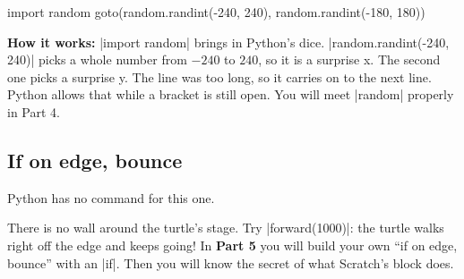 \begin{tcbraster}[raster columns=5, raster equal height=rows, raster column skip=12pt, raster valign=center]
\begin{tcolorbox}[raster multicolumn=2, colback=white, colframe=white, boxrule=0pt, valign=center]
\begin{scratch}
\end{scratch}
\end{tcolorbox}
\begin{tcolorbox}[raster multicolumn=3, blank]
\begin{code}
import random
goto(random.randint(-240, 240),
     random.randint(-180, 180))
\end{code}
\end{tcolorbox}
\end{tcbraster}

\textbf{How it works:} \py|import random| brings in Python's dice. \py|random.randint(-240, 240)| picks a whole number from $-240$ to $240$, so it is a surprise x. The second one picks a surprise y. The line was too long, so it carries on to the next line. Python allows that while a bracket is still open. You will meet \py|random| properly in Part 4.

\subsection*{If on edge, bounce}

\begin{tcbraster}[raster columns=2, raster equal height=rows, raster column skip=12pt, raster valign=center]
\begin{tcolorbox}[colback=white, colframe=white, boxrule=0pt, valign=center]
\begin{scratch}
\end{scratch}
\end{tcolorbox}
\begin{tcolorbox}[colback=warnbg, colframe=warnframe, boxrule=0.6pt, arc=5pt]
Python has no command for this one.
\end{tcolorbox}
\end{tcbraster}

There is no wall around the turtle's stage. Try \py|forward(1000)|: the turtle walks right off the edge and keeps going! In \textbf{Part 5} you will build your own ``if on edge, bounce'' with an \py|if|. Then you will know the secret of what Scratch's block does.

